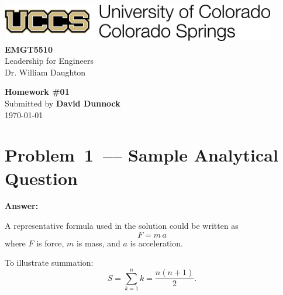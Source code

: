 \documentclass[12pt]{article}
\newenvironment{problem}{\color{dodblue}\itshape}{\par}
\newcommand{\homeworknum}{01}  %
\begin{document}
\begin{center}
    \includegraphics[width=0.9\textwidth,keepaspectratio]{uccs-logo.png}\\[8\baselineskip]

    {\HeadingFont\fontsize{24}{26}\selectfont\textbf{EMGT5510}}\\[0.25\baselineskip]
    {\large Leadership for Engineers}\\[0.15\baselineskip]
    {\small Dr. William Daughton}\\[2\baselineskip]
\vfill

    {\HeadingFont\fontsize{20}{22}\selectfont\textbf{Homework \#\homeworknum}}\\[0.5\baselineskip]
    {Submitted by \textbf{David Dunnock}}\\[0.15\baselineskip]
    {\today}
\end{center}

\newpage

\section*{Problem 1 –– Sample Analytical Question}
\begin{problem}
\lipsum[1]
\end{problem}

\textbf{Answer:}\\
\lipsum[2]

A representative formula used in the solution could be written as
\begin{equation}\label{eq:newton}
F = m\,a
\end{equation}
where $F$ is force, $m$ is mass, and $a$ is acceleration.

To illustrate summation:
\begin{equation}
S = \sum_{k=1}^{n} k = \frac{n(n+1)}{2}.
\end{equation}

\end{document}
